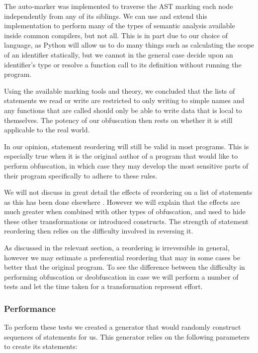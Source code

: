 \documentclass[twoside,a4paper]{report}
\begin{document}
The auto-marker was implemented to traverse the AST marking each node independently from any of its siblings. We can use and extend this implementation
to perform many of the types of semantic analysis available inside common compilers, but not all. This is in part due to our choice of language, as Python
will allow us to do many things such as calculating the scope of an identifier statically, but we cannot in the general case decide upon an identifier's
type or resolve a function call to its definition without running the program.

Using the available marking tools and theory, we concluded that the lists of statements we read or write are restricted to only writing to simple names
and any functions that are called should only be able to write data that is local to themselves. The potency of our obfuscation then rests on whether
it is still applicable to the real world.

In our opinion, statement reordering will still be valid in most programs. This is especially true when it is the original author of a program that would
like to perform obfuscation, in which case they may develop the most sensitive parts of their program specifically to adhere to these rules.

We will not discuss in great detail the effects of reordering on a list of statements as this has been done elsewhere \cite{taxobftrans}. However we will
explain that the effects are much greater when combined with other types of obfuscation, and used to hide these other transformations or introduced constructs.
The strength of statement reordering then relies on the difficulty involved in reversing it.

As discussed in the relevant section, a reordering is irreversible in general, however we may estimate a preferential reordering that may in some cases be better
that the original program. To see the difference between the difficulty in performing obfuscation or deobfuscation in case we will perform a number of tests and
let the time taken for a transformation represent effort.

\subsubsection{Performance}

To perform these tests we created a generator that would randomly construct sequences of statements for us. This generator relies on the following
parameters to create its statements:
\end{document}
